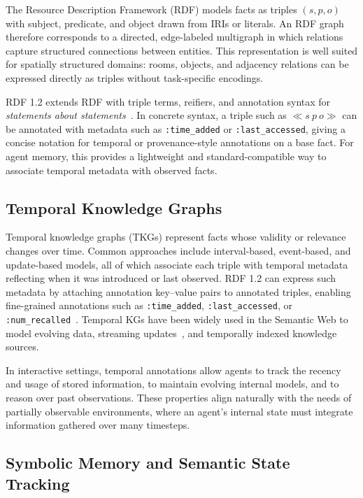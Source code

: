 \documentclass[Afour,sageh,times]{sagej}
\begin{document}
The Resource Description Framework (RDF) models facts as triples $(s,p,o)$ with subject,
predicate, and object drawn from IRIs or literals. An RDF graph therefore corresponds to
a directed, edge-labeled multigraph in which relations capture structured connections
between entities. This representation is well suited for spatially structured domains:
rooms, objects, and adjacency relations can be expressed directly as triples without
task-specific encodings.

RDF 1.2 extends RDF with triple terms, reifiers, and annotation syntax for
\emph{statements about statements}~\citep{rdf12concepts,rdf12turtle}. In concrete
syntax, a triple such as $\ll s\ p\ o\gg$ can be annotated with metadata such as
\texttt{:time\_added} or \texttt{:last\_accessed}, giving a concise notation for
temporal or provenance-style annotations on a base fact. For agent memory, this provides
a lightweight and standard-compatible way to associate temporal metadata with observed
facts.

\subsection{Temporal Knowledge Graphs}

Temporal knowledge graphs (TKGs) represent facts whose validity or relevance changes
over time. Common approaches include interval-based, event-based, and update-based
models, all of which associate each triple with temporal metadata reflecting when it was
introduced or last observed. RDF 1.2 can express such metadata by attaching annotation
key--value pairs to annotated triples, enabling fine-grained annotations such as
\texttt{:time\_added}, \texttt{:last\_accessed}, or
\texttt{:num\_recalled}~\citep{rdf12concepts,rdf12turtle,moreau2012prov}. Temporal KGs have been widely used in the
Semantic Web to model evolving data, streaming
updates~\citep{dellaglio2017streamreasoning}, and temporally indexed knowledge sources.

In interactive settings, temporal annotations allow agents to track the recency and usage
of stored information, to maintain evolving internal models, and to reason over past
observations. These properties align naturally with the needs of partially observable
environments, where an agent’s internal state must integrate information gathered over
many timesteps.

\subsection{Symbolic Memory and Semantic State Tracking}
\end{document}
